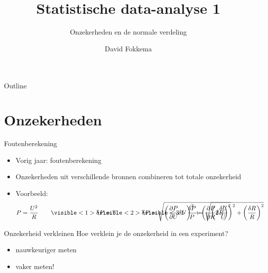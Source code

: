 \documentclass{beamer}
\title{Statistische data-analyse 1}
\subtitle{Onzekerheden en de normale verdeling}
\author{David Fokkema}
\institute{
  Practicum natuurkunde \\
  Vrije Universiteit / Universiteit van Amsterdam
}
\date{}
\begin{document}
\begin{frame}
  \titlepage
\end{frame}

\begin{frame}{Outline}
  \tableofcontents
\end{frame}




\section{Onzekerheden}

\begin{frame}{Foutenberekening}
  \begin{itemize}
    \item Vorig jaar: foutenberekening
    \item Onzekerheden uit verschillende bronnen combineren tot totale onzekerheid
    \item Voorbeeld:
    \begin{equation*}
        P = \frac{U^2}{R} \qquad
        \visible<1>
        {\mathrlap{\delta P = \ ?}}
        \visible<2>
        {\mathrlap{\delta P = \sqrt{\left(\frac{\partial P}{\partial U}\delta U\right)^2 + \left(\frac{\partial P}{\partial R}\delta R\right)^2}}}
        \visible<3>
        {\frac{\delta P}{P} = \sqrt{\left(2\frac{\delta U}{U}\right)^2 + \left(\frac{\delta R}{R}\right)^2}}
    \end{equation*}
  \end{itemize}
\end{frame}

\begin{frame}{Onzekerheid verkleinen}
  Hoe verklein je de onzekerheid in een experiment?
  \begin{itemize}
    \item nauwkeuriger meten
    \item<2-> \alert{vaker} meten!
  \end{itemize}
\end{frame}
\end{document}

